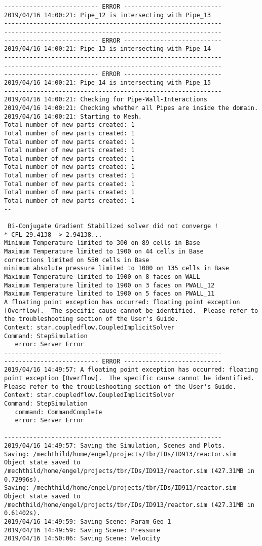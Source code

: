\documentclass{article}
\begin{document}
{\begin{verbatim}
-------------------------- ERROR ---------------------------
2019/04/16 14:00:21: Pipe_12 is intersecting with Pipe_13
------------------------------------------------------------
------------------------------------------------------------
-------------------------- ERROR ---------------------------
2019/04/16 14:00:21: Pipe_13 is intersecting with Pipe_14
------------------------------------------------------------
------------------------------------------------------------
-------------------------- ERROR ---------------------------
2019/04/16 14:00:21: Pipe_14 is intersecting with Pipe_15
------------------------------------------------------------
2019/04/16 14:00:21: Checking for Pipe-Wall-Interactions
2019/04/16 14:00:21: Checking whether all Pipes are inside the domain.
2019/04/16 14:00:21: Starting to Mesh.
Total number of new parts created: 1
Total number of new parts created: 1
Total number of new parts created: 1
Total number of new parts created: 1
Total number of new parts created: 1
Total number of new parts created: 1
Total number of new parts created: 1
Total number of new parts created: 1
Total number of new parts created: 1
Total number of new parts created: 1
--

 Bi-Conjugate Gradient Stabilized solver did not converge !
* CFL 29.4138 -> 2.94138...
Minimum Temperature limited to 300 on 89 cells in Base
Maximum Temperature limited to 1900 on 44 cells in Base
corrections limited on 550 cells in Base
minimum absolute pressure limited to 1000 on 135 cells in Base
Maximum Temperature limited to 1900 on 8 faces on WALL
Maximum Temperature limited to 1900 on 3 faces on PWALL_12
Maximum Temperature limited to 1900 on 5 faces on PWALL_11
A floating point exception has occurred: floating point exception [Overflow].  The specific cause cannot be identified.  Please refer to the troubleshooting section of the User's Guide.
Context: star.coupledflow.CoupledImplicitSolver
Command: StepSimulation
   error: Server Error
------------------------------------------------------------
-------------------------- ERROR ---------------------------
2019/04/16 14:49:57: A floating point exception has occurred: floating point exception [Overflow].  The specific cause cannot be identified.  Please refer to the troubleshooting section of the User's Guide.
Context: star.coupledflow.CoupledImplicitSolver
Command: StepSimulation
   command: CommandComplete
   error: Server Error

------------------------------------------------------------
2019/04/16 14:49:57: Saving the Simulation, Scenes and Plots.
Saving: /mechthild/home/engel/projects/tbr/IDs/ID913/reactor.sim
Object state saved to /mechthild/home/engel/projects/tbr/IDs/ID913/reactor.sim (427.31MB in 0.72996s).
Saving: /mechthild/home/engel/projects/tbr/IDs/ID913/reactor.sim
Object state saved to /mechthild/home/engel/projects/tbr/IDs/ID913/reactor.sim (427.31MB in 0.61402s).
2019/04/16 14:49:59: Saving Scene: Param_Geo 1
2019/04/16 14:49:59: Saving Scene: Pressure
2019/04/16 14:50:06: Saving Scene: Velocity
\end{verbatim}
}
\clearpage
\end{document}
